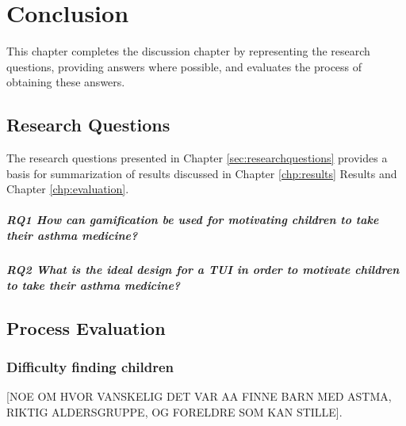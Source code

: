 \chapter{Conclusion}
\label{chp:masterconclusion}

This chapter completes the discussion chapter by representing the research questions, providing answers where possible, and evaluates the process of obtaining these answers. 

\section{Research Questions}

The research questions presented in Chapter \ref{sec:researchquestions} provides a basis for summarization of results discussed in Chapter \ref{chp:results} Results and Chapter \ref{chp:evaluation}. 

\paragraph{RQ1 How can gamification be used for motivating children to take their asthma medicine?}



\paragraph{RQ2 What is the ideal design for a TUI in order to motivate children to take their asthma medicine?}



\section{Process Evaluation}

\subsection{Difficulty finding children}
[NOE OM HVOR VANSKELIG DET VAR AA FINNE BARN MED ASTMA, RIKTIG ALDERSGRUPPE, OG FORELDRE SOM KAN STILLE].  